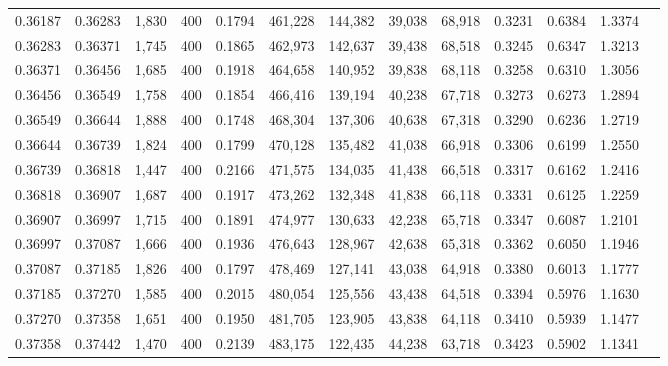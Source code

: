 \begin{tabular}{rrrrrrrrrrrrr}
0.36187 & 0.36283 &  1,830 &   400 &                                     0.1794 & 461,228 & 144,382 &  39,038 &  68,918 & 0.3231 & 0.6384 & 1.3374 \\
0.36283 & 0.36371 &  1,745 &   400 &                                     0.1865 & 462,973 & 142,637 &  39,438 &  68,518 & 0.3245 & 0.6347 & 1.3213 \\
0.36371 & 0.36456 &  1,685 &   400 &                                     0.1918 & 464,658 & 140,952 &  39,838 &  68,118 & 0.3258 & 0.6310 & 1.3056 \\
0.36456 & 0.36549 &  1,758 &   400 &                                     0.1854 & 466,416 & 139,194 &  40,238 &  67,718 & 0.3273 & 0.6273 & 1.2894 \\
0.36549 & 0.36644 &  1,888 &   400 &                                     0.1748 & 468,304 & 137,306 &  40,638 &  67,318 & 0.3290 & 0.6236 & 1.2719 \\
0.36644 & 0.36739 &  1,824 &   400 &                                     0.1799 & 470,128 & 135,482 &  41,038 &  66,918 & 0.3306 & 0.6199 & 1.2550 \\
0.36739 & 0.36818 &  1,447 &   400 &                                     0.2166 & 471,575 & 134,035 &  41,438 &  66,518 & 0.3317 & 0.6162 & 1.2416 \\
0.36818 & 0.36907 &  1,687 &   400 &                                     0.1917 & 473,262 & 132,348 &  41,838 &  66,118 & 0.3331 & 0.6125 & 1.2259 \\
0.36907 & 0.36997 &  1,715 &   400 &                                     0.1891 & 474,977 & 130,633 &  42,238 &  65,718 & 0.3347 & 0.6087 & 1.2101 \\
0.36997 & 0.37087 &  1,666 &   400 &                                     0.1936 & 476,643 & 128,967 &  42,638 &  65,318 & 0.3362 & 0.6050 & 1.1946 \\
0.37087 & 0.37185 &  1,826 &   400 &                                     0.1797 & 478,469 & 127,141 &  43,038 &  64,918 & 0.3380 & 0.6013 & 1.1777 \\
0.37185 & 0.37270 &  1,585 &   400 &                                     0.2015 & 480,054 & 125,556 &  43,438 &  64,518 & 0.3394 & 0.5976 & 1.1630 \\
0.37270 & 0.37358 &  1,651 &   400 &                                     0.1950 & 481,705 & 123,905 &  43,838 &  64,118 & 0.3410 & 0.5939 & 1.1477 \\
0.37358 & 0.37442 &  1,470 &   400 &                                     0.2139 & 483,175 & 122,435 &  44,238 &  63,718 & 0.3423 & 0.5902 & 1.1341 \\

\end{tabular}
